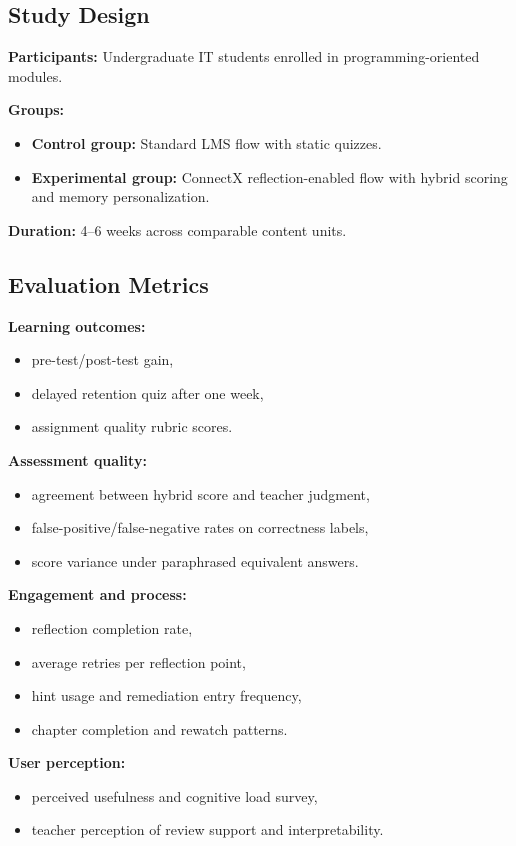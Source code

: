 \documentclass[conference]{IEEEtran}
\begin{document}
\subsection{Study Design}
\textbf{Participants:} Undergraduate IT students enrolled in programming-oriented modules.

\textbf{Groups:}
\begin{itemize}
\item \textbf{Control group:} Standard LMS flow with static quizzes.
\item \textbf{Experimental group:} ConnectX reflection-enabled flow with hybrid scoring and memory personalization.
\end{itemize}

\textbf{Duration:} 4--6 weeks across comparable content units.

\subsection{Evaluation Metrics}
\textbf{Learning outcomes:}
\begin{itemize}
\item pre-test/post-test gain,
\item delayed retention quiz after one week,
\item assignment quality rubric scores.
\end{itemize}

\textbf{Assessment quality:}
\begin{itemize}
\item agreement between hybrid score and teacher judgment,
\item false-positive/false-negative rates on correctness labels,
\item score variance under paraphrased equivalent answers.
\end{itemize}

\textbf{Engagement and process:}
\begin{itemize}
\item reflection completion rate,
\item average retries per reflection point,
\item hint usage and remediation entry frequency,
\item chapter completion and rewatch patterns.
\end{itemize}

\textbf{User perception:}
\begin{itemize}
\item perceived usefulness and cognitive load survey,
\item teacher perception of review support and interpretability.
\end{itemize}
\end{document}
